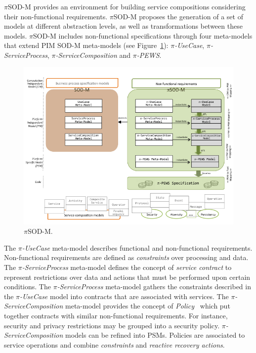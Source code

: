 $\pi$SOD-M provides an environment for building service compositions considering
their non-functional requirements. $\pi$SOD-M proposes the generation of a set of models at different abstraction levels, as well as transformations between these models.
$\pi$SOD-M includes non-functional specifications through
 four meta-models that extend PIM SOD-M meta-models (see Figure~\ref{fig:piSOD-M}): \textit{$\pi$-UseCase}, \textit{$\pi$-ServiceProcess}, \textit{$\pi$-ServiceCom\-po\-si\-tion} and \textit{$\pi$-PEWS}.

\begin{figure}[t]
\centering
\includegraphics[width=1\textwidth]{figs/piSOD-M.png}
\caption{$\pi$SOD-M.}
\label{fig:piSOD-M}
\end{figure}
%
The \textit{$\pi$-UseCase} meta-model describes functional and non-functional requirements.
Non-functional requirements are defined as \textit{constraints} over processing and data. 
%
The \textit{$\pi$-ServiceProcess} meta-model defines the concept of \textit{service contract} to represent restrictions over data and actions that must be performed upon certain conditions. 
%
The \textit{$\pi$-ServiceProcess} meta-model gathers the constraints
described in the \textit{$\pi$-UseCase} model into contracts that are associated
with services. 
%
The \textit{$\pi$-ServiceComposition} meta-model provides the concept of \textit{Policy}~\cite{Espinosa-Oviedo2011a}
which put together contracts with similar non-functional requirements. 
For instance, security and privacy restrictions may be grouped into a security policy.
\textit{$\pi$-ServiceComposition} models can be refined into PSMs. Policies are associated to service operations and combine \textit{constraints} and \textit{reactive recovery actions}.

